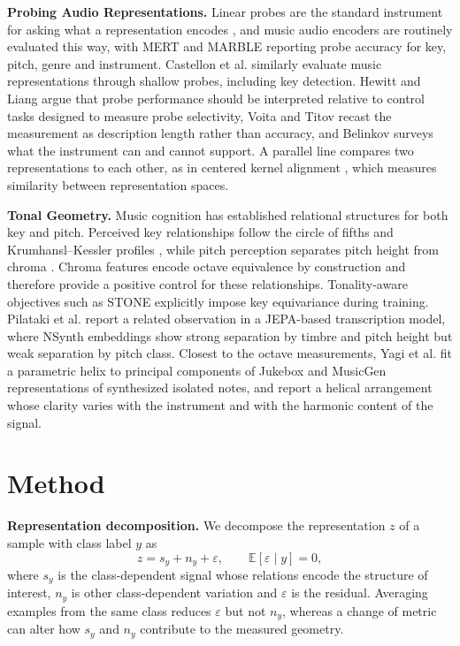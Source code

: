 \documentclass{article}
\begin{document}
\noindent\textbf{Probing Audio Representations.}
Linear probes are the standard instrument for asking what a representation
encodes \cite{probes,koh2026steering}, and music audio encoders are routinely evaluated this way, with MERT \cite{mert} and MARBLE \cite{marble} reporting probe accuracy for key, pitch, genre and instrument. Castellon et al. \cite{castellon2021} similarly evaluate music representations through shallow probes, including key detection. Hewitt and Liang \cite{controltasks} argue that probe performance should be
interpreted relative to control tasks designed to measure probe selectivity,
Voita and Titov \cite{voita2020} recast the measurement as description length
rather than accuracy, and Belinkov \cite{belinkov2022} surveys what the
instrument can and cannot support. A parallel line compares two representations
to each other, as in centered kernel alignment \cite{cka}, which measures similarity between representation spaces.

\noindent\textbf{Tonal Geometry.}
Music cognition has established relational structures for both key and pitch. Perceived key relationships follow the circle of fifths and Krumhansl--Kessler profiles \cite{krumhansl1982,krumhansl1990}, while pitch perception separates pitch height from chroma \cite{shepard1982}. Chroma features \cite{brown1991,librosa} encode octave equivalence by construction and therefore provide a positive control for these relationships. Tonality-aware objectives such as STONE \cite{stone} explicitly impose key
equivariance during training. Pilataki et al. \cite{pilataki2025} report a related observation in a JEPA-based transcription model, where NSynth embeddings show strong separation by timbre and pitch height but weak separation by pitch class. Closest to the octave measurements, Yagi et al. \cite{yagi2026} fit a parametric helix to principal components of
Jukebox \cite{jukebox} and MusicGen \cite{musicgen} representations of
synthesized isolated notes, and report a helical arrangement whose clarity varies with the instrument and with the harmonic content of the signal.

\section{Method}
\label{sec:method}

\noindent\textbf{Representation decomposition.} We decompose the representation $z$ of a sample with class label $y$ as
\begin{equation}
z = s_y + n_y + \varepsilon, \qquad \mathbb{E}[\varepsilon \mid y] = 0,
\label{eq:decomp}
\end{equation}
\noindent where $s_y$ is the class-dependent signal whose relations encode the structure of interest, $n_y$ is other class-dependent variation and $\varepsilon$ is the residual. Averaging examples from the same class reduces $\varepsilon$ but not $n_y$, whereas a change of metric can alter how $s_y$ and $n_y$ contribute to the measured geometry.
\end{document}
